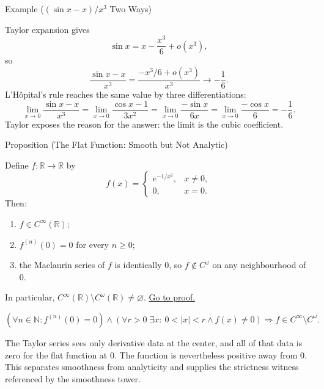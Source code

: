 \begin{definitionbox}{Example (\((\sin x-x)/x^3\) Two Ways)}
\label{ex:sinx-limit}
\begin{remark*}
Taylor expansion gives
\[
  \sin x=x-\frac{x^3}{6}+o(x^3),
\]
so
\[
  \frac{\sin x-x}{x^3}
  =
  \frac{-x^3/6+o(x^3)}{x^3}
  \longrightarrow
  -\frac16.
\]
L'H\^{o}pital's rule reaches the same value by three differentiations:
\[
  \lim_{x\to0}\frac{\sin x-x}{x^3}
  =
  \lim_{x\to0}\frac{\cos x-1}{3x^2}
  =
  \lim_{x\to0}\frac{-\sin x}{6x}
  =
  \lim_{x\to0}\frac{-\cos x}{6}
  =
  -\frac16.
\]
Taylor exposes the reason for the answer: the limit is the cubic coefficient.
\end{remark*}
\end{definitionbox}


\begin{propositionbox}{Proposition (The Flat Function: Smooth but Not Analytic)}
\begin{proposition}
\label{prop:flat-function}
Define \(f:\mathbb{R}\to\mathbb{R}\) by
\[
  f(x)=
  \begin{cases}
    e^{-1/x^2}, & x\neq 0,\\
    0, & x=0.
  \end{cases}
\]
Then:
\begin{enumerate}
  \item \(f\in C^\infty(\mathbb{R})\);
  \item \(f^{(n)}(0)=0\) for every \(n\geq 0\);
  \item the Maclaurin series of \(f\) is identically \(0\), so \(f\notin C^\omega\) on any neighbourhood of \(0\).
\end{enumerate}
In particular, \(C^\infty(\mathbb{R})\setminus C^\omega(\mathbb{R})\neq\varnothing\).
\hyperref[prf:flat-function]{Go to proof.}
\end{proposition}
\end{propositionbox}

\begin{remark*}
\[
  \left(
  \forall n\in\mathbb{N}: f^{(n)}(0)=0
  \right)
  \land
  \left(
  \forall r>0\;\exists x:\ 0<|x|<r\land f(x)\neq 0
  \right)
  \Longrightarrow
  f\in C^\infty\setminus C^\omega.
\]
\end{remark*}

\begin{remark*}[Interpretation]
The Taylor series sees only derivative data at the center, and all of that data is zero for the flat function at \(0\). The function is nevertheless positive away from \(0\). This separates smoothness from analyticity and supplies the strictness witness referenced by the smoothness tower.
\end{remark*}

